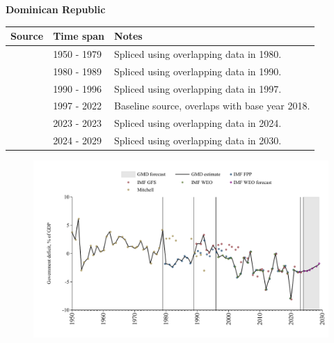 \documentclass[12pt,a4paper,landscape]{article}
\begin{document}
\begin{adjustbox}{max totalsize={\paperwidth}{\paperheight},center}
\begin{minipage}[t][\textheight][t]{\textwidth}
\vspace*{0.5cm}
{}
\begin{center}
{\Large\bfseries Dominican Republic}
\end{center}
\vspace{0.5cm}
\begin{table}[H]
\centering
\small
\begin{tabular}{|l|l|l|}
\hline
\textbf{Source} & \textbf{Time span} & \textbf{Notes} \\
\hline
\rowcolor{white}\cite{Mitchell}& 1950 - 1979 &Spliced using overlapping data in 1980.\\
\rowcolor{lightgray}\cite{IMF_FPP}& 1980 - 1989 &Spliced using overlapping data in 1990.\\
\rowcolor{white}\cite{IMF_GFS}& 1990 - 1996 &Spliced using overlapping data in 1997.\\
\rowcolor{lightgray}\cite{IMF_WEO}& 1997 - 2022 &Baseline source, overlaps with base year 2018.\\
\rowcolor{white}\cite{IMF_GFS}& 2023 - 2023 &Spliced using overlapping data in 2024.\\
\rowcolor{lightgray}\cite{IMF_WEO_forecast}& 2024 - 2029 &Spliced using overlapping data in 2030.\\
\hline
\end{tabular}
\end{table}
\begin{figure}[H]
\centering
\includegraphics[width=\textwidth,height=0.6\textheight,keepaspectratio]{graphs/DOM_govdef_GDP.pdf}
\end{figure}
\end{minipage}
\end{adjustbox}
\end{document}
